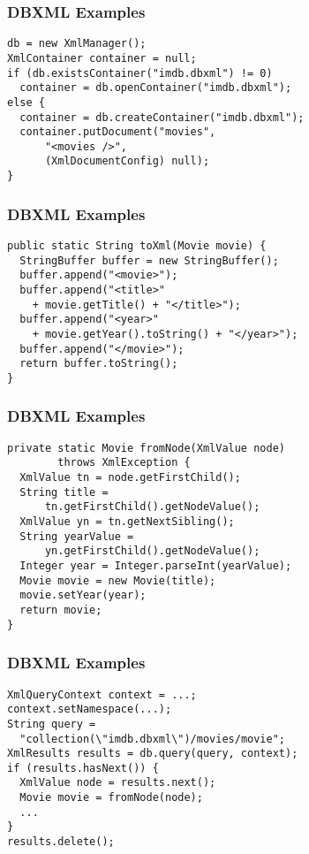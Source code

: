 \documentclass[dvipsnames]{beamer}
\theoremstyle{plain}
\begin{document}
\begin{frame}[fragile]
  \frametitle{DBXML Examples}

  \begin{example}
    \begin{lstlisting}
db = new XmlManager();
XmlContainer container = null;
if (db.existsContainer("imdb.dbxml") != 0)
  container = db.openContainer("imdb.dbxml");
else {
  container = db.createContainer("imdb.dbxml");
  container.putDocument("movies",
      "<movies />",
      (XmlDocumentConfig) null);
}
    \end{lstlisting}
  \end{example}
\end{frame}

\begin{frame}[fragile]
  \frametitle{DBXML Examples}

  \begin{example}
    \begin{lstlisting}
public static String toXml(Movie movie) {
  StringBuffer buffer = new StringBuffer();
  buffer.append("<movie>");
  buffer.append("<title>"
    + movie.getTitle() + "</title>");
  buffer.append("<year>"
    + movie.getYear().toString() + "</year>");
  buffer.append("</movie>");
  return buffer.toString();
}
    \end{lstlisting}
  \end{example}
\end{frame}

\begin{frame}[fragile]
  \frametitle{DBXML Examples}

  \begin{example}
    \begin{lstlisting}
private static Movie fromNode(XmlValue node)
        throws XmlException {
  XmlValue tn = node.getFirstChild();
  String title =
      tn.getFirstChild().getNodeValue();
  XmlValue yn = tn.getNextSibling();
  String yearValue =
      yn.getFirstChild().getNodeValue();
  Integer year = Integer.parseInt(yearValue);
  Movie movie = new Movie(title);
  movie.setYear(year);
  return movie;
}
    \end{lstlisting}
  \end{example}
\end{frame}

\begin{frame}[fragile]
  \frametitle{DBXML Examples}

  \begin{example}
    \begin{lstlisting}
XmlQueryContext context = ...;
context.setNamespace(...);
String query =
  "collection(\"imdb.dbxml\")/movies/movie";
XmlResults results = db.query(query, context);
if (results.hasNext()) {
  XmlValue node = results.next();
  Movie movie = fromNode(node);
  ...
}
results.delete();
    \end{lstlisting}
  \end{example}
\end{frame}
\end{document}

